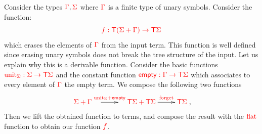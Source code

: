 \noindent\begin{example}[Filter]\label{ex:filter} Consider the types ${\color{red}{\Gamma}}, {\color{red}{\Sigma}}$  where ${\color{red}{\Gamma}}$ is a finite type of unary symbols. Consider the function:
$$ {\color{red}{f:{\color{red}{\mathsf T}}({\color{red}{\Sigma}}+{\color{red}{\Gamma}})\to{\color{red}{\mathsf T}}{\color{red}{\Sigma}}}}$$
which erases the elements of ${\color{red}{\Gamma}}$ from the input term. This function is well defined since erasing unary symbols does not break the tree structure of the input.
Let us explain why this is a derivable function.
Consider the basic functions ${\color{red}{{\color{red}{\mathrm{unit}}}_{\color{red}{\Sigma}}:{\color{red}{\Sigma}}\to{\color{red}{\mathsf T}}{\color{red}{\Sigma}}}}$ and the constant function ${\color{red}{\mathsf{empty}:{\color{red}{\Gamma}}\to{\color{red}{\mathsf T}}{\color{red}{\Sigma}}}}$ which associates to every element of ${\color{red}{\Gamma}}$ the empty term. We compose the following two functions 
\begin{align*}
\xymatrix{
    \ranked{\rSigma+\rGamma}\quad \ar[r]^-{\ranked{\unit_\Sigma+\mathsf{empty}}} & \quad \ranked{\tmonad\rSigma+\tmonad\rSigma}\ar[r]^-{\ranked{\mathrm{forget}}} &\tmonad\rSigma
},
\end{align*}
Then we lift the obtained function to terms, and compose the result with the ${\color{red}{\mathrm{flat}}}$ function to obtain our function ${\color{red}{f}}$.  
\end{example}

